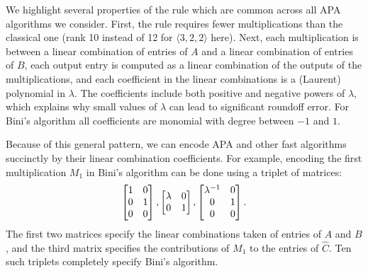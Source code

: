 \documentclass[sigconf,review,anonymous]{acmart}
\newcommand{\dims}[1]{\langle #1 \rangle}
\begin{document}
We highlight several properties of the rule which are common across all APA algorithms we consider.
First, the rule requires fewer multiplications than the classical one (rank 10 instead of 12 for $\dims{3,2,2}$ here).
Next, each multiplication is between a linear combination of entries of $A$ and a linear combination of entries of $B$, each output entry is computed as a linear combination of the outputs of the multiplications, and each coefficient in the linear combinations is a (Laurent) polynomial in $\lambda$.
The coefficients include both positive and negative powers of $\lambda$, which explains why small values of $\lambda$ can lead to significant roundoff error.
For Bini's algorithm all coefficients are monomial with degree between $-1$ and $1$.

Because of this general pattern, we can encode APA and other fast algorithms succinctly by their linear combination coefficients.
For example, encoding the first multiplication $M_1$ in Bini's algorithm can be done using a triplet of matrices:
\begin{equation}
\label{eq:triplet}
\begin{bmatrix} 1 & 0 \\ 0 & 1 \\ 0 & 0 \end{bmatrix}, \hfill
\begin{bmatrix} \lambda & 0 \\ 0 & 1 \end{bmatrix}, \hfill
\begin{bmatrix} \lambda^{-1} & 0 \\ 0 & 1 \\ 0 & 0 \end{bmatrix}.
\end{equation}
The first two matrices specify the linear combinations taken of entries of $A$ and $B$, and the third matrix specifies the contributions of $M_1$ to the entries of $\hat C$.
Ten such triplets completely specify Bini's algorithm.
\end{document}
